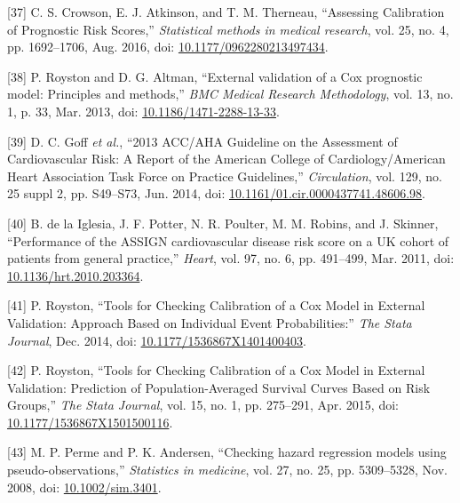 \documentclass[12pt,PhD,twoside,openright]{muthesis}
\newenvironment{cslreferences}%
  {}%
  {\par}
\begin{document}
\begin{cslreferences}
\leavevmode\hypertarget{ref-crowson_assessing_2016}{}%
{[}37{]} C. S. Crowson, E. J. Atkinson, and T. M. Therneau, ``Assessing Calibration of Prognostic Risk Scores,'' \emph{Statistical methods in medical research}, vol. 25, no. 4, pp. 1692--1706, Aug. 2016, doi: \href{https://doi.org/10.1177/0962280213497434}{10.1177/0962280213497434}.

\leavevmode\hypertarget{ref-royston_external_2013}{}%
{[}38{]} P. Royston and D. G. Altman, ``External validation of a Cox prognostic model: Principles and methods,'' \emph{BMC Medical Research Methodology}, vol. 13, no. 1, p. 33, Mar. 2013, doi: \href{https://doi.org/10.1186/1471-2288-13-33}{10.1186/1471-2288-13-33}.

\leavevmode\hypertarget{ref-goff_2013_2014}{}%
{[}39{]} D. C. Goff \emph{et al.}, ``2013 ACC/AHA Guideline on the Assessment of Cardiovascular Risk: A Report of the American College of Cardiology/American Heart Association Task Force on Practice Guidelines,'' \emph{Circulation}, vol. 129, no. 25 suppl 2, pp. S49--S73, Jun. 2014, doi: \href{https://doi.org/10.1161/01.cir.0000437741.48606.98}{10.1161/01.cir.0000437741.48606.98}.

\leavevmode\hypertarget{ref-de_la_iglesia_performance_2011}{}%
{[}40{]} B. de la Iglesia, J. F. Potter, N. R. Poulter, M. M. Robins, and J. Skinner, ``Performance of the ASSIGN cardiovascular disease risk score on a UK cohort of patients from general practice,'' \emph{Heart}, vol. 97, no. 6, pp. 491--499, Mar. 2011, doi: \href{https://doi.org/10.1136/hrt.2010.203364}{10.1136/hrt.2010.203364}.

\leavevmode\hypertarget{ref-royston_tools_2014}{}%
{[}41{]} P. Royston, ``Tools for Checking Calibration of a Cox Model in External Validation: Approach Based on Individual Event Probabilities:'' \emph{The Stata Journal}, Dec. 2014, doi: \href{https://doi.org/10.1177/1536867X1401400403}{10.1177/1536867X1401400403}.

\leavevmode\hypertarget{ref-royston_tools_2015}{}%
{[}42{]} P. Royston, ``Tools for Checking Calibration of a Cox Model in External Validation: Prediction of Population-Averaged Survival Curves Based on Risk Groups,'' \emph{The Stata Journal}, vol. 15, no. 1, pp. 275--291, Apr. 2015, doi: \href{https://doi.org/10.1177/1536867X1501500116}{10.1177/1536867X1501500116}.

\leavevmode\hypertarget{ref-perme_checking_2008}{}%
{[}43{]} M. P. Perme and P. K. Andersen, ``Checking hazard regression models using pseudo-observations,'' \emph{Statistics in medicine}, vol. 27, no. 25, pp. 5309--5328, Nov. 2008, doi: \href{https://doi.org/10.1002/sim.3401}{10.1002/sim.3401}.


\end{cslreferences}
\end{document}
